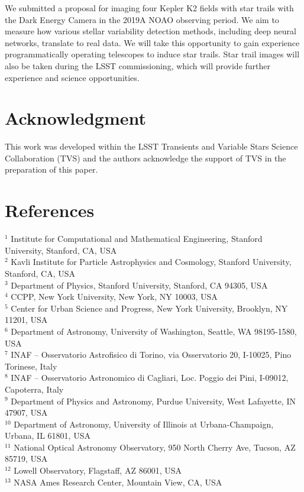 \documentclass[12pt, letterpaper]{article}
\begin{document}
We submitted a proposal for imaging four Kepler K2 fields with star trails with the Dark Energy Camera in the 2019A NOAO observing period. We aim to measure how various stellar variability detection methods, including deep neural networks, translate to real data. We will take this opportunity to gain experience programmatically operating telescopes to induce star trails. Star trail images will also be taken during the LSST commissioning, which will provide further experience and science opportunities.

\section{Acknowledgment}
\label{sec:ack}
This work was developed within the LSST Transients and Variable Stars Science Collaboration (TVS) and the authors acknowledge the support of TVS in the preparation of this paper.

\section{References}

\begingroup
\renewcommand{\section}[2]{}%


\endgroup

\section*{Author Affiliations}
\parbox{\textwidth}{
\footnotesize
$^{1}$ Institute for Computational and Mathematical Engineering, Stanford University, Stanford, CA, USA\\
$^{2}$ Kavli Institute for Particle Astrophysics and Cosmology, Stanford University, Stanford, CA, USA\\
$^{3}$ Department of Physics, Stanford University, Stanford, CA 94305, USA\\
$^{4}$ CCPP, New York University, New York, NY 10003, USA\\
$^{5}$ Center for Urban Science and Progress, New York University, Brooklyn, NY 11201, USA\\
$^{6}$ Department of Astronomy, University of Washington, Seattle, WA 98195-1580, USA\\
$^{7}$ INAF – Osservatorio Astrofisico di Torino, via Osservatorio 20, I-10025, Pino Torinese, Italy\\
$^{8}$ INAF – Osservatorio Astronomico di Cagliari, Loc. Poggio dei Pini, I-09012, Capoterra, Italy\\
$^{9}$ Department of Physics and Astronomy, Purdue University, West Lafayette, IN 47907, USA\\
$^{10}$ Department of Astronomy, University of Illinois at Urbana-Champaign, Urbana, IL 61801, USA\\
$^{11}$ National Optical Astronomy Observatory, 950 North Cherry
Ave, Tucson, AZ 85719, USA\\
$^{12}$ Lowell Observatory, Flagstaff, AZ 86001, USA\\
$^{13}$ NASA Ames Research Center, Mountain View, CA, USA\\
}
\end{document}

